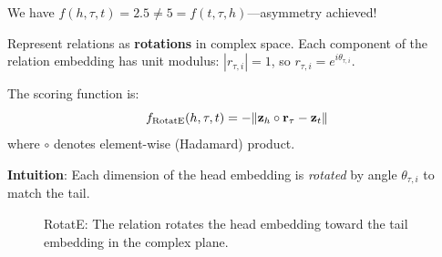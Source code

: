 \begin{notechapter}
\begin{example}
We have $f(h, \tau, t) = 2.5 \neq 5 = f(t, \tau, h)$---asymmetry achieved!
\end{example}

\begin{definition}
Represent relations as \textbf{rotations} in complex space. Each component of the relation embedding has unit modulus: $|r_{\tau,i}| = 1$, so $r_{\tau,i} = e^{i\theta_{\tau,i}}$.

The scoring function is:
\begin{equation}
f_{\text{RotatE}}(h, \tau, t) = -\|\mathbf{z}_h \circ \mathbf{r}_\tau - \mathbf{z}_t\|
\end{equation}
where $\circ$ denotes element-wise (Hadamard) product.

\textbf{Intuition}: Each dimension of the head embedding is \emph{rotated} by angle $\theta_{\tau,i}$ to match the tail.
\end{definition}

\begin{figure}[htbp]
\centering
{}
\caption{RotatE: The relation rotates the head embedding toward the tail embedding in the complex plane.}
\label{shallow-embeddings:fig:rotate}
\end{figure}


\end{notechapter}
